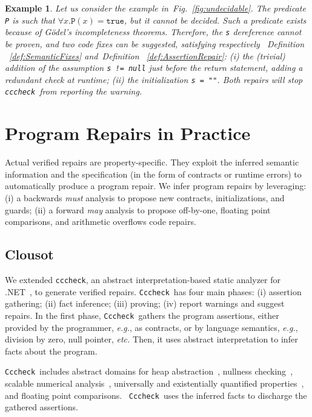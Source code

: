 \documentclass[10pt]{sigplanconf}
\newtheorem{example}{Example}
\newcommand{\refFig}[1]{Fig.~\ref{fig:#1}}
\newcommand{\refDef}[1]{Definition ~\ref{def:#1}}
\newcommand{\code}[1]{\texttt{#1}}
\newcommand{\clousot}{\code{cccheck}}
\newcommand{\Clousot}{\code{Cccheck}}
\begin{document}
\begin{example}\normalfont
Let us consider the example in~\refFig{undecidable}.
The predicate \code{P} is such that $\forall x. \code{P}(x) = \code{true}$, but it cannot be decided.
Such a predicate exists because of G\"odel's incompleteness theorems.
Therefore, the \code{s} dereference cannot be proven, and two code fixes can be suggested, satisfying respectively ~\refDef{SemanticFixes} and~\refDef{AssertionRepair}: (i)
the (trivial) addition of the assumption \code{s != null} just before the return statement, adding a \emph{redundant} check at runtime; (ii) the initialization \code{s = ""}.
Both repairs will stop \clousot\ from reporting the warning.
\end{example}

\section{Program Repairs in Practice}
\label{sec:fixespractice}

Actual verified repairs are property-specific.
They exploit the inferred semantic information and the specification (in the form of contracts or runtime errors) to automatically produce a program repair.
We infer program repairs by leveraging: (i) a backwards \emph{must} analysis to propose new contracts, initializations, and guards; (ii) a forward \emph{may} analysis to propose off-by-one, floating point comparisons, and arithmetic overflows code repairs.

\subsection{Clousot}

We extended \clousot, an abstract interpretation-based static analyzer
for .NET~\cite{cccheck}, to generate verified repairs.
\Clousot\ has four main phases: (i) assertion gathering; (ii) fact inference; 
(iii) proving; (iv) report warnings and suggest repairs.  In the first
phase, \Clousot\ gathers the program assertions, either provided by
the programmer, \emph{e.g.}, as contracts, or by language semantics,
\emph{e.g.}, division by zero, null pointer, \emph{etc.}  Then, it uses
abstract interpretation to infer facts about the program.



\Clousot\ includes abstract domains for heap abstraction~\cite{Fahndrich10}, nullness checking~\cite{FahndrichLeino03}, scalable numerical analysis~\cite{LogozzoFahndrich08,subpolyhedra}, universally and existentially quantified properties~\cite{CousotCousotLogozzo-POPL11}, and floating point comparisons.~\cite{LogozzoFahndrich11}
\Clousot\ uses the inferred facts to discharge the gathered assertions.
\end{document}
